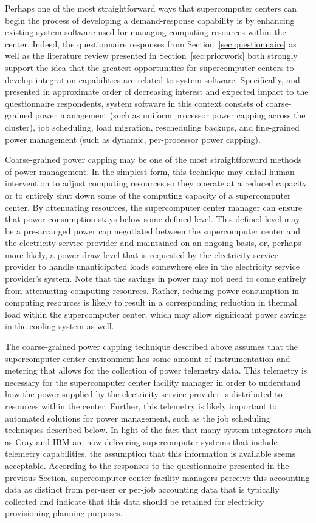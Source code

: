 Perhaps one of the most straightforward ways that supercomputer
centers can begin the process of developing a demand-response
capability is by enhancing existing system software used for managing
computing resources within the center.  Indeed, the questionnaire
responses from Section~\ref{sec:questionnaire} as well as the literature
review presented in Section~\ref{sec:priorwork} both strongly support the
idea that the greatest opportunities for supercomputer centers to
develop integration capabilities are related to system software.
Specifically, and presented in approximate order of decreasing
interest and expected impact to the questionnaire respondents, system
software in this context consists of coarse-grained power management
(such as uniform processor power capping across the cluster), 
job scheduling, load migration, rescheduling backups, and fine-grained 
power management (such as dynamic, per-processor power capping).

Coarse-grained power capping may be one of the most straightforward
methods of power management.  In the simplest form, this technique may
entail human intervention to adjust computing resources so they
operate at a reduced capacity or to entirely shut down some of the
computing capacity of a supercomputer center.  By attenuating
resources, the supercomputer center manager can ensure that power
consumption stays below some defined level.  This defined level may be
a pre-arranged power cap negotiated between the supercomputer center
and the electricity service provider and maintained on an ongoing basis,
or, perhaps more likely, a power draw level that is requested by the
electricity service provider to handle unanticipated loads somewhere else
in the electricity service provider's system.  
Note that the savings
in power may not need to come entirely from attenuating computing
resources.  Rather, reducing power consumption in computing resources
is likely to result in a corresponding reduction in thermal load
within the supercomputer center, which
may allow significant power savings in the cooling system as well.

The coarse-grained power capping technique described above assumes
that the supercomputer center environment has some amount of
instrumentation and metering that allows for the collection of power
telemetry data.  This telemetry is necessary for the supercomputer
center facility manager in order to understand how the power supplied
by the electricity service provider is distributed to resources within the
center.  Further, this telemetry is likely important to automated
solutions for power management, such as the job scheduling techniques
described below.  In light of the fact that many system integrators
such as Cray and IBM are now delivering supercomputer systems that
include telemetry capabilities, the assumption that this information
is available seems acceptable.  According to the responses to the
questionnaire presented in the previous Section, supercomputer center
facility managers perceive this accounting data as distinct from
per-user or per-job accounting data that is typically collected and
indicate that this data should be retained for electricity
provisioning planning purposes.


